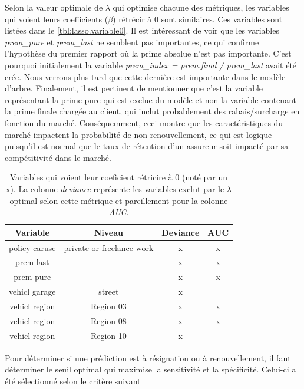 \documentclass[]{article}
\begin{document}
Selon la valeur optimale de \(\lambda\) qui optimise chacune des
métriques, les variables qui voient leurs coefficients (\(\beta\))
rétrécir à \(0\) sont similaires. Ces variables sont listées dans le
\autoref{tbl:lasso.variable0}. Il est intéressant de voir que les
variables \emph{prem\_pure} et \emph{prem\_last} ne semblent pas
importantes, ce qui confirme l'hypothèse du premier rapport où la prime
absolue n'est pas importante. C'est pourquoi initialement la variable
\emph{prem\_index = prem.final / prem\_last} avait été crée. Nous
verrons plus tard que cette dernière est importante dans le modèle
d'arbre. Finalement, il est pertinent de mentionner que c'est la
variable représentant la prime pure qui est exclue du modèle et non la
variable contenant la prime finale chargée au client, qui inclut
probablement des rabais/surcharge en fonction du marché. Conséquemment,
ceci montre que les caractéristiques du marché impactent la probabilité
de non-renouvellement, ce qui est logique puisqu'il est normal que le
taux de rétention d'un assureur soit impacté par sa compétitivité dans
le marché.

\begin{table}[ht]
\centering
\caption{Variables qui voient leur coeficient rétricire à $0$ (noté
          par un x). La colonne \emph{deviance} représente les variables
          exclut par le $\lambda$ optimal selon cette métrique et pareillement
          pour la colonne \emph{AUC}.} 
\label{tbl:lasso.variable0}
\begin{tabular}{cccc}
  \hline
Variable & Niveau & Deviance & AUC \\ 
  \hline
policy caruse & private or freelance work & x & x \\ 
  prem last & - & x & x \\ 
  prem pure & - & x & x \\ 
  vehicl garage & street & x &   \\ 
  vehicl region & Region 03 & x & x \\ 
  vehicl region & Region 08 & x & x \\ 
  vehicl region & Region 10 & x &   \\ 
   \hline
\end{tabular}
\end{table}

Pour déterminer si une prédiction est à résignation ou à renouvellement,
il faut déterminer le seuil optimal qui maximise la sensitivité et la
spécificité. Celui-ci a été sélectionné selon le critère suivant
\end{document}
